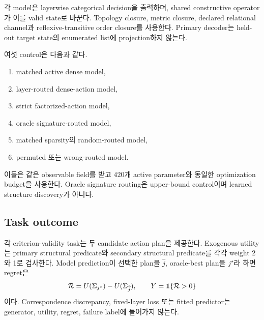 각 model은 layerwise categorical decision을 출력하며, shared constructive
operator가 이를 valid state로 바꾼다. Topology closure, metric closure,
declared relational channel과 reflexive-transitive order closure를 사용한다.
Primary decoder는 held-out target state의 enumerated list에 projection하지
않는다.

여섯 control은 다음과 같다.
\begin{enumerate}[label=(\arabic*)]
    \item matched active dense model,
    \item layer-routed dense-action model,
    \item strict factorized-action model,
    \item oracle signature-routed model,
    \item matched sparsity의 random-routed model,
    \item permuted 또는 wrong-routed model.
\end{enumerate}
이들은 같은 observable field를 받고 \(420\)개 active parameter와 동일한
optimization budget을 사용한다. Oracle signature routing은 upper-bound
control이며 learned structure discovery가 아니다.

\subsection{Task outcome}

각 criterion-validity task는 두 candidate action plan을 제공한다. Exogenous
utility는 primary structural predicate와 secondary structural predicate를
각각 weight 2와 1로 검사한다. Model prediction이 선택한 plan을
\(\widehat j\), oracle-best plan을 \(j^\star\)라 하면 regret은
\[
\mathcal R
=
U(\Sigma_{j^\star})-U(\Sigma_{\widehat j}),
\qquad
Y=\mathbf 1\{\mathcal R>0\}
\]
이다. Correspondence discrepancy, fixed-layer loss 또는 fitted predictor는
generator, utility, regret, failure label에 들어가지 않는다.
